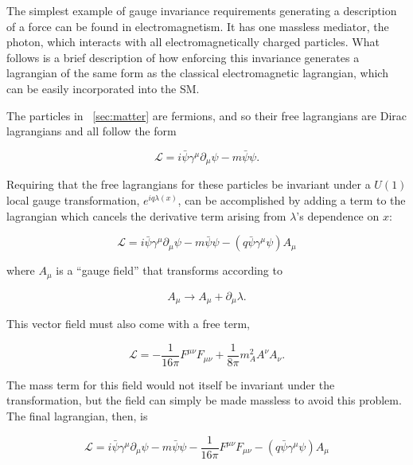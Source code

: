 The simplest example of gauge invariance requirements generating a description of a force can be found in electromagnetism. It has one massless mediator, the photon, which interacts with all electromagnetically charged particles. What follows is a brief description of how enforcing this invariance generates a lagrangian of the same form as the classical electromagnetic lagrangian, which can be easily incorporated into the \ac{SM}. 

The particles in ~\autoref{sec:matter} are fermions, and so their free lagrangians are Dirac lagrangians and all follow the form

\begin{equation}
\mathcal{L} = i\bar{\psi}\gamma^\mu \partial_\mu\psi - m \bar{\psi}\psi . 
\end{equation}

Requiring that the free lagrangians for these particles be invariant under a $U(1)$ local gauge transformation, $e^{iq\lambda(x)}$, can be accomplished by adding a term to the lagrangian which cancels the derivative term arising from $\lambda$'s dependence on $x$: 

\begin{equation}
\mathcal{L} = i\bar{\psi}\gamma^\mu \partial_\mu\psi - m \bar{\psi}\psi - (q\bar{\psi}\gamma^\mu\psi)A_\mu
\end{equation}

where $A_\mu$ is a ``gauge field'' that transforms according to 

\begin{equation}
A_\mu \rightarrow A_\mu + \partial_\mu \lambda . 
\end{equation}

This vector field must also come with a free term, 

\begin{equation}
\mathcal{L} = -\frac{1}{16\pi}F^{\mu\nu}F_{\mu\nu} + \frac{1}{8\pi}m_A^2A^\nu A_\nu . 
\end{equation}

The mass term for this field would not itself be invariant under the transformation, but the field can simply be made massless to avoid this problem. The final lagrangian, then, is 

\begin{equation}
\mathcal{L} = i\bar{\psi}\gamma^\mu \partial_\mu\psi - m \bar{\psi}\psi -\frac{1}{16\pi}F^{\mu\nu}F_{\mu\nu} - (q\bar{\psi}\gamma^\mu\psi)A_\mu
\label{eq:l_em}
\end{equation}

